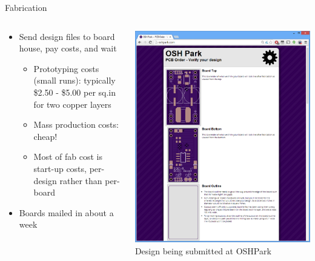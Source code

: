 \documentclass{beamer}
\begin{document}
\begin{frame}{Fabrication}
  \begin{columns}[T]
    \begin{column}{.6\textwidth}
      \begin{itemize}
        \item Send design files to board house, pay costs, and wait
        \begin{itemize}
          \item Prototyping costs (small runs): typically \$2.50 - \$5.00 per sq.in for two copper layers
          \item Mass production costs: cheap!
          \item Most of fab cost is start-up costs, per-design rather than per-board
        \end{itemize}
        \item Boards mailed in about a week
      \end{itemize}
    \end{column}

    \begin{column}{0.4\textwidth}
      \includegraphics[width=0.9\columnwidth]{../images/diptrace/dcdc_oshpark} \\
      Design being submitted at OSHPark
    \end{column}
  \end{columns}
\end{frame}
\end{document}
